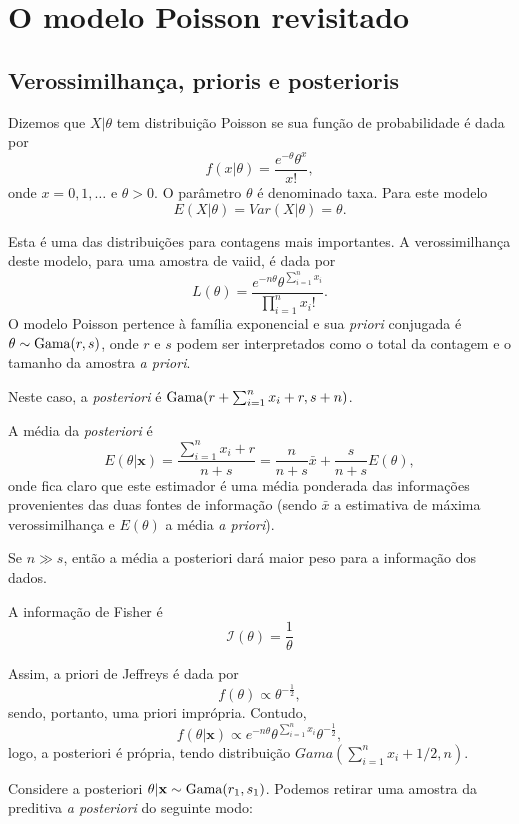 \documentclass[
  letterpaper,
  DIV=11,
  numbers=noendperiod]{scrreprt}
\theoremstyle{definition}
\theoremstyle{definition}
\theoremstyle{plain}
\theoremstyle{remark}
\begin{document}

\chapter{O modelo Poisson revisitado}\label{o-modelo-poisson-revisitado}

\section{Verossimilhança, prioris e
posterioris}\label{verossimilhanuxe7a-prioris-e-posterioris}

Dizemos que \(X|\theta\) tem distribuição Poisson se sua função de
probabilidade é dada por \[f(x|\theta)=\frac{e^{-\theta}\theta^x}{x!},\]
onde \(x=0,1,\ldots\) e \(\theta>0\). O parâmetro \(\theta\) é
denominado taxa. Para este modelo \[E(X|\theta)=Var(X|\theta)=\theta.\]

Esta é uma das distribuições para contagens mais importantes. A
verossimilhança deste modelo, para uma amostra de vaiid, é dada por
\[L(\theta)=\frac{e^{-n\theta}\theta^{\sum_{i=1}^{n}x_i}}{\prod_{i=1}^{n}x_i!}.\]
O modelo Poisson pertence à família exponencial e sua \textit{priori}
conjugada é \(\theta\sim\hbox{Gama}(r,s)\), onde \(r\) e \(s\) podem ser
interpretados como o total da contagem e o tamanho da amostra
\textit{a priori}.

Neste caso, a \textit{posteriori} é
\(\hbox{Gama}(r+\sum_{i=1}^n x_i+r, s+n)\).

A média da \textit{posteriori} é
\[E(\theta|\mathbf{x})=\frac{\sum_{i=1}^{n}x_i+r}{n+s}=\frac{n}{n+s}\bar{x}+\frac{s}{n+s}E(\theta),\]
onde fica claro que este estimador é uma média ponderada das informações
provenientes das duas fontes de informação (sendo \(\bar{x}\) a
estimativa de máxima verossimilhança e \(E(\theta)\) a média
\textit{a priori}).

Se \(n\gg s\), então a média a posteriori dará maior peso para a
informação dos dados.

A informação de Fisher é \[\mathcal{I}(\theta)=\frac{1}{\theta}\]

Assim, a priori de Jeffreys é dada por
\[f(\theta)\propto \theta^{-\frac{1}{2}},\] sendo, portanto, uma priori
imprópria. Contudo,
\[f(\theta|\mathbf{x})\propto e^{-n\theta}\theta^{\sum_{i=1}^{n}x_i} \theta^{-\frac{1}{2}},\]
logo, a posteriori é própria, tendo distribuição
\(Gama(\sum_{i=1}^{n}x_i+1/2,n)\).

Considere a posteriori \(\theta|\mathbf{x}\sim\hbox{Gama}(r_1,s_1)\).
Podemos retirar uma amostra da preditiva \textit{a posteriori} do
seguinte modo:
\end{document}
